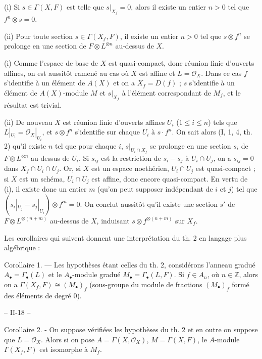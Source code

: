 (i) Si $s \in \Gamma(X, F)$ est telle que $s|_{X_f} = 0$, alors il existe un entier $n > 0$ tel que $f^n \otimes s = 0$.

(ii) Pour toute section $s \in \Gamma(X_f, F)$, il existe un entier $n > 0$ tel que $s \otimes f^n$ se prolonge en une section de $F \otimes L^{\otimes n}$ au-dessus de $X$.

(i) Comme l'espace de base de $X$ est quasi-compact, donc réunion finie d'ouverts affines, on est aussitôt ramené au cas où $X$ est affine et $L = \mathcal{O}_X$. Dans ce cas $f$ s'identifie à un élément de $A(X)$ et on a $X_f = D(f)$ ; $s$ s'identifie à un élément de $A(X)$-module $M$ et $s|_{X_f}$ à l'élément correspondant de $M_f$, et le résultat est trivial.

(ii) De nouveau $X$ est réunion finie d'ouverts affines $U_i$ ($1 \leq i \leq n$) tels que $L|_{U_i} = \mathcal{O}_X|_{U_i}$, et $s \otimes f^n$ s'identifie sur chaque $U_i$ à $s \cdot f^n$. On sait alors (I, 1, 4, th. 2) qu'il existe $n$ tel que pour chaque $i$, $s|_{U_i \cap X_f}$ se prolonge en une section $s_i$ de $F \otimes L^{\otimes n}$ au-dessus de $U_i$. Si $s_{ij}$ est la restriction de $s_i - s_j$ à $U_i \cap U_j$, on a $s_{ij} = 0$ dans $X_f \cap U_i \cap U_j$. Or, si $X$ est un espace noethérien, $U_i \cap U_j$ est quasi-compact ; si $X$ est un schéma, $U_i \cap U_j$ est affine, donc encore quasi-compact. En vertu de (i), il existe donc un entier $m$ (qu'on peut supposer indépendant de $i$ et $j$) tel que $(s_i|_{U_j} - s_j|_{U_i}) \otimes f^m = 0$. On conclut aussitôt qu'il existe une section $s'$ de $F \otimes L^{\otimes (n+m)}$ au-dessus de $X$, induisant $s \otimes f^{\otimes (n+m)}$ sur $X_f$.

Les corollaires qui suivent donnent une interprétation du th. 2 en langage plus algébrique :

Corollaire 1. — Les hypothèses étant celles du th. 2, considérons l'anneau gradué $A_\bullet = \Gamma_\bullet(L)$ et le $A_\bullet$-module gradué $M_\bullet = \Gamma_\bullet(L, F)$. Si $f \in A_n$, où $n \in \mathbb{Z}$, alors on a $\Gamma(X_f, F) \cong (M_\bullet)_f$ (sous-groupe du module de fractions $(M_\bullet)_f$ formé des éléments de degré 0).

\newpage


-- II-18 --

Corollaire 2. - On suppose vérifiées les hypothèses du th. 2 et en outre on suppose que $L = \mathcal{O}_X$. Alors si on pose $A = \Gamma(X, \mathcal{O}_X)$, $M = \Gamma(X, F)$, le $A$-module $\Gamma(X_f, F)$ est isomorphe à $M_f$.

